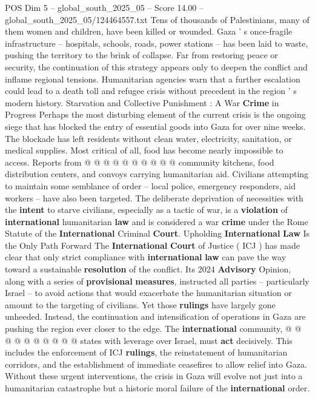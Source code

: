 \begin{textsample}{POS Dim 5 – global\_south\_2025\_05 – Score 14.00 – global\_south\_2025\_05/124464557.txt}
Tens of thousands of Palestinians, many of them women and children, have been killed or wounded.
Gaza ' s once-fragile infrastructure -- hospitals, schools, roads, power stations -- has been laid to waste, pushing the territory to the brink of collapse.
Far from restoring peace or security, the continuation of this strategy appears only to deepen the conflict and inflame regional tensions.
Humanitarian agencies warn that a further escalation could lead to a death toll and refugee crisis without precedent in the region ' s modern history.
Starvation and Collective Punishment : A War \textbf{Crime} in Progress Perhaps the most disturbing element of the current crisis is the ongoing siege that has blocked the entry of essential goods into Gaza for over nine weeks.
The blockade has left residents without clean water, electricity, sanitation, or medical supplies.
Most critical of all, food has become nearly impossible to access.
Reports from @ @ @ @ @ @ @ @ @ @ community kitchens, food distribution centers, and convoys carrying humanitarian aid.
Civilians attempting to maintain some semblance of order -- local police, emergency responders, aid workers -- have also been targeted.
The deliberate deprivation of necessities with the \textbf{intent} to starve civilians, especially as a tactic of war, is a \textbf{violation} of \textbf{international} humanitarian \textbf{law} and is considered a war \textbf{crime} under the Rome Statute of the \textbf{International} Criminal \textbf{Court}.
Upholding \textbf{International} \textbf{Law} Is the Only Path Forward The \textbf{International} \textbf{Court} of Justice ( ICJ ) has made clear that only strict compliance with \textbf{international} \textbf{law} can pave the way toward a sustainable \textbf{resolution} of the conflict.
Its 2024 \textbf{Advisory} Opinion, along with a series of \textbf{provisional} \textbf{measures}, instructed all parties -- particularly Israel -- to avoid actions that would exacerbate the humanitarian situation or amount to the targeting of civilians.
Yet those \textbf{rulings} have largely gone unheeded.
Instead, the continuation and intensification of operations in Gaza are pushing the region ever closer to the edge.
The \textbf{international} community, @ @ @ @ @ @ @ @ @ @ states with leverage over Israel, must \textbf{act} decisively.
This includes the enforcement of ICJ \textbf{rulings}, the reinstatement of humanitarian corridors, and the establishment of immediate ceasefires to allow relief into Gaza.
Without these urgent interventions, the crisis in Gaza will evolve not just into a humanitarian catastrophe but a historic moral failure of the \textbf{international} order.

\end{textsample}
